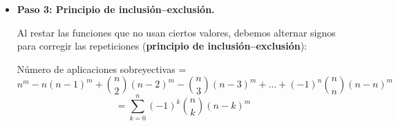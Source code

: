 \documentclass[a4paper,12pt]{article}
\begin{document}
\begin{ejercicio}[title=Ejercicio 21 (⋆)]
\begin{itemize}
\begin{itemize}
\item Si faltan 2 valores de $B$, hay $\binom{n}{2}$ formas de elegir los 2 valores que no se usan, y los $m$ elementos de $A$ solo se pueden asignar a los $n-2$ valores restantes.

Total: $\binom{n}{2}(n-2)^m$.

\item Entonces en general, si faltan $k$ valores de $B$, hay

$\binom{n}{k}(n-k)^m$ aplicaciones.

\end{itemize}

\item \textbf{Paso 3: Principio de inclusión–exclusión.}  

Al restar las funciones que no usan ciertos valores, debemos alternar signos para corregir las repeticiones (\textbf{principio de inclusión–exclusión}):

Número de aplicaciones sobreyectivas = 
\[
n^m - n(n-1)^m + \binom{n}{2}(n-2)^m - \binom{n}{3}(n-3)^m + \dots + (-1)^n \binom{n}{n}(n-n)^m
\]
\vspace{0.5em}
\[
= \boxed{\sum_{k=0}^{n} (-1)^k \binom{n}{k} (n-k)^m}
\]

\end{itemize}

\end{ejercicio}
\end{document}
